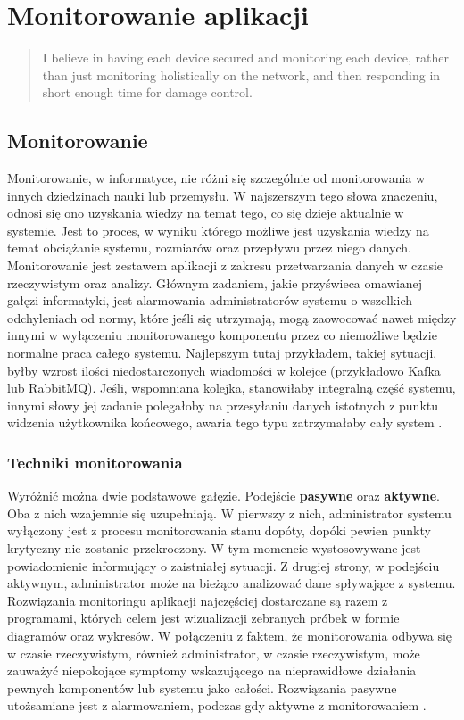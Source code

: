 \chapter[Monitorowania aplikacji]{Monitorowanie aplikacji}
\label{chapter:monitoring}

\begin{quote}
    I believe in having each device secured and monitoring each device, rather than just
    monitoring holistically on the network, and then responding in short enough time for damage control.
\end{quote}

\section{Monitorowanie}
    Monitorowanie, w informatyce, nie różni się szczególnie od monitorowania w innych dziedzinach nauki lub przemysłu. 
    W najszerszym tego słowa znaczeniu, odnosi się ono uzyskania wiedzy na temat tego, co się dzieje aktualnie w systemie.
    Jest to proces, w wyniku którego możliwe jest uzyskania wiedzy na temat obciążanie systemu, rozmiarów oraz przepływu przez niego
    danych. Monitorowanie jest zestawem aplikacji z zakresu przetwarzania danych w czasie rzeczywistym oraz analizy. 
    Głównym zadaniem, jakie przyświeca omawianej gałęzi informatyki, jest alarmowania administratorów systemu o wszelkich
    odchyleniach od normy, które jeśli się utrzymają, mogą zaowocować nawet między innymi w wyłączeniu monitorowanego
    komponentu przez co niemożliwe będzie normalne praca całego systemu. Najlepszym tutaj przykładem, takiej sytuacji, 
    byłby wzrost ilości niedostarczonych wiadomości w kolejce (przykładowo Kafka lub RabbitMQ). Jeśli, wspomniana kolejka,
    stanowiłaby integralną część systemu, innymi słowy jej zadanie polegałoby na przesyłaniu danych istotnych z punktu
    widzenia użytkownika końcowego, awaria tego typu zatrzymałaby cały system \cite{monitoring_and_alerting}.
    
    \subsection{Techniki monitorowania}
    Wyróżnić można dwie podstawowe gałęzie. Podejście \textbf{pasywne} oraz \textbf{aktywne}. Oba z nich wzajemnie się uzupełniają.
    W pierwszy z nich, administrator systemu wyłączony jest z procesu monitorowania stanu dopóty, dopóki pewien
    punkty krytyczny nie zostanie przekroczony. W tym momencie wystosowywane jest powiadomienie informujący o zaistniałej
    sytuacji. Z drugiej strony, w podejściu aktywnym, administrator może na bieżąco analizować dane spływające z systemu.
    Rozwiązania monitoringu aplikacji najczęściej dostarczane są razem z programami, których celem jest 
    wizualizacji zebranych próbek w formie diagramów oraz wykresów. W połączeniu z faktem, że monitorowania odbywa się
    w czasie rzeczywistym, również administrator, w czasie rzeczywistym, może zauważyć niepokojące symptomy wskazującego
    na nieprawidłowe działania pewnych komponentów lub systemu jako całości.
    Rozwiązania pasywne utożsamiane jest z alarmowaniem, podczas gdy aktywne z monitorowaniem \cite{monitoring_and_alerting}.
    
